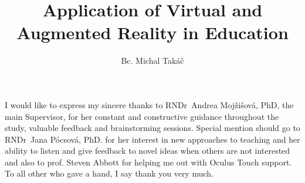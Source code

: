 \documentclass[]{tukethesis}
\author{Bc. Michal Takáč}
\title{Application of Virtual and Augmented Reality in Education}
\subtitle{}
\begin{document}
\renewcommand\theHfigure{\theHsection.\arabic{figure}}
\renewcommand\theHtable{\theHsection.\arabic{table}}

\firstpage

\titlepage


%
%

\abstrakte %


\endabstract %

\assignthesis

\declaration

\acknowledgement %
I would like to express my sincere thanks to RNDr~Andrea
Mojžišová, PhD, the main Supervisor, for her constant and constructive guidance throughout the study, valuable feedback and brainstorming sessions. Special mention should go
to RNDr~Jana Pócsová, PhD. for her interest in new approaches to teaching and her ability to listen and give feedback to novel ideas when others are not interested and also to prof. Steven Abbott for helping me out with Oculus Touch support. To all other who gave a hand, I say thank you
very much.
\endacknowledgement
\end{document}
